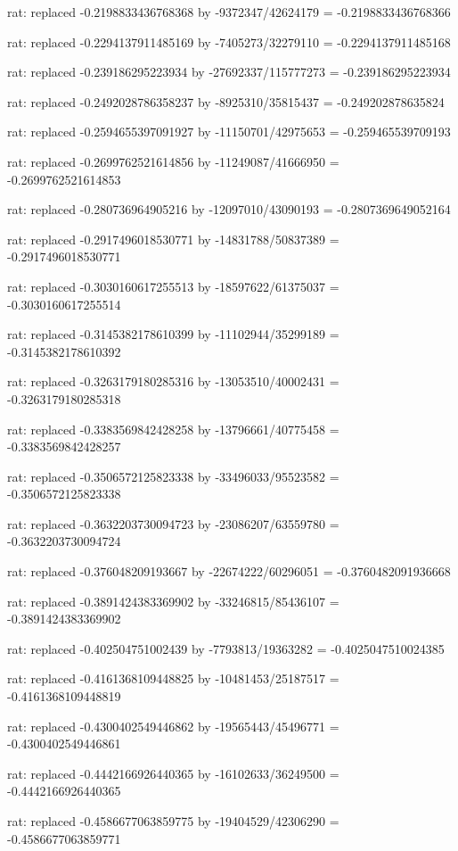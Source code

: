 \documentclass[a4paper,10pt]{article}
\begin{document}
\begin{eulernotebook}
\begin{eulercomment}
\begin{eulercomment}
\begin{eulercomment}
\begin{eulercomment}
\begin{eulercomment}
\begin{eulercomment}
\begin{eulercomment}
\begin{eulercomment}
\begin{eulercomment}
\begin{eulercomment}
\begin{eulercomment}
\begin{eulercomment}
\begin{eulercomment}
\begin{eulercomment}
\begin{eulercomment}
\begin{eulercomment}
\begin{euleroutput}
  rat: replaced -0.2198833436768368 by -9372347/42624179 = -0.2198833436768366
  
  rat: replaced -0.2294137911485169 by -7405273/32279110 = -0.2294137911485168
  
  rat: replaced -0.239186295223934 by -27692337/115777273 = -0.239186295223934
  
  rat: replaced -0.2492028786358237 by -8925310/35815437 = -0.249202878635824
  
  rat: replaced -0.2594655397091927 by -11150701/42975653 = -0.259465539709193
  
  rat: replaced -0.2699762521614856 by -11249087/41666950 = -0.2699762521614853
  
  rat: replaced -0.280736964905216 by -12097010/43090193 = -0.2807369649052164
  
  rat: replaced -0.2917496018530771 by -14831788/50837389 = -0.2917496018530771
  
  rat: replaced -0.3030160617255513 by -18597622/61375037 = -0.3030160617255514
  
  rat: replaced -0.3145382178610399 by -11102944/35299189 = -0.3145382178610392
  
  rat: replaced -0.3263179180285316 by -13053510/40002431 = -0.3263179180285318
  
  rat: replaced -0.3383569842428258 by -13796661/40775458 = -0.3383569842428257
  
  rat: replaced -0.3506572125823338 by -33496033/95523582 = -0.3506572125823338
  
  rat: replaced -0.3632203730094723 by -23086207/63559780 = -0.3632203730094724
  
  rat: replaced -0.376048209193667 by -22674222/60296051 = -0.3760482091936668
  
  rat: replaced -0.3891424383369902 by -33246815/85436107 = -0.3891424383369902
  
  rat: replaced -0.402504751002439 by -7793813/19363282 = -0.4025047510024385
  
  rat: replaced -0.4161368109448825 by -10481453/25187517 = -0.4161368109448819
  
  rat: replaced -0.4300402549446862 by -19565443/45496771 = -0.4300402549446861
  
  rat: replaced -0.4442166926440365 by -16102633/36249500 = -0.4442166926440365
  
  rat: replaced -0.4586677063859775 by -19404529/42306290 = -0.4586677063859771
  

\end{euleroutput}
\end{eulercomment}
\end{eulercomment}
\end{eulercomment}
\end{eulercomment}
\end{eulercomment}
\end{eulercomment}
\end{eulercomment}
\end{eulercomment}
\end{eulercomment}
\end{eulercomment}
\end{eulercomment}
\end{eulercomment}
\end{eulercomment}
\end{eulercomment}
\end{eulercomment}
\end{eulercomment}
\end{eulernotebook}
\end{document}
